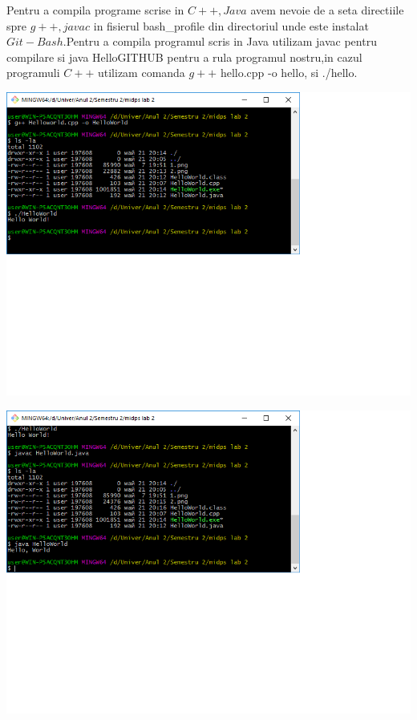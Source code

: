 Pentru a compila programe scrise in $C++,Java$ avem nevoie de a seta directiile spre $g++,javac$ in fisierul bash\_profile din directoriul unde este instalat $Git-Bash$.Pentru a compila programul scris in Java utilizam javac pentru compilare si java HelloGITHUB pentru a rula programul nostru,in cazul programuli $C++$ utilizam comanda $g++ $ hello.cpp -o hello, si ./hello.\\
\begin{center}
\includegraphics[scale=0.75]{images/2}\\
\end{center}
\begin{center}
\includegraphics[scale=0.75]{images/3}\\
\end{center}

